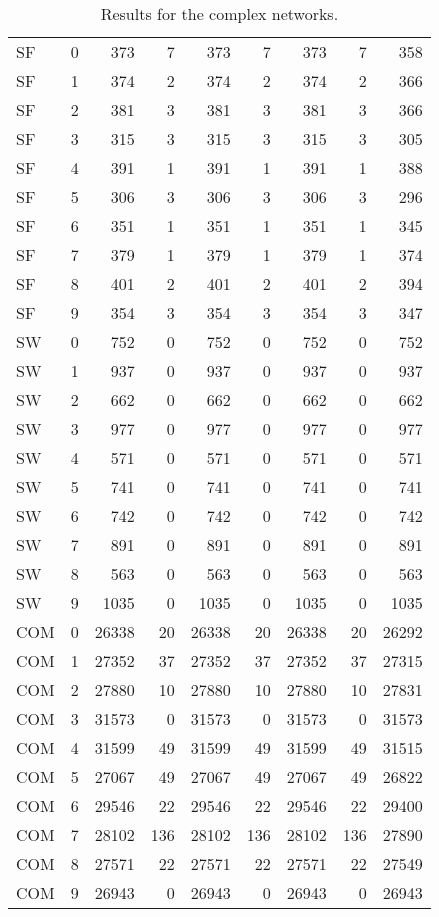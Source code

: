 \documentclass{scrartcl}
\theoremstyle{plain}
\begin{document}
\begin{table}[!ht]
\begin{tabular}{|lr|rr|rr|rr|r|}
\makeatletter{}SF & 0 & 373 & 7 & 373 & 7 & 373 & 7 & 358 \\ 
SF & 1 & 374 & 2 & 374 & 2 & 374 & 2 & 366 \\ 
SF & 2 & 381 & 3 & 381 & 3 & 381 & 3 & 366 \\ 
SF & 3 & 315 & 3 & 315 & 3 & 315 & 3 & 305 \\ 
SF & 4 & 391 & 1 & 391 & 1 & 391 & 1 & 388 \\ 
SF & 5 & 306 & 3 & 306 & 3 & 306 & 3 & 296 \\ 
SF & 6 & 351 & 1 & 351 & 1 & 351 & 1 & 345 \\ 
SF & 7 & 379 & 1 & 379 & 1 & 379 & 1 & 374 \\ 
SF & 8 & 401 & 2 & 401 & 2 & 401 & 2 & 394 \\ 
SF & 9 & 354 & 3 & 354 & 3 & 354 & 3 & 347 \\ 
SW & 0 & 752 & 0 & 752 & 0 & 752 & 0 & 752 \\ 
SW & 1 & 937 & 0 & 937 & 0 & 937 & 0 & 937 \\ 
SW & 2 & 662 & 0 & 662 & 0 & 662 & 0 & 662 \\ 
SW & 3 & 977 & 0 & 977 & 0 & 977 & 0 & 977 \\ 
SW & 4 & 571 & 0 & 571 & 0 & 571 & 0 & 571 \\ 
SW & 5 & 741 & 0 & 741 & 0 & 741 & 0 & 741 \\ 
SW & 6 & 742 & 0 & 742 & 0 & 742 & 0 & 742 \\ 
SW & 7 & 891 & 0 & 891 & 0 & 891 & 0 & 891 \\ 
SW & 8 & 563 & 0 & 563 & 0 & 563 & 0 & 563 \\ 
SW & 9 & 1035 & 0 & 1035 & 0 & 1035 & 0 & 1035 \\ 
COM & 0 & 26338 & 20 & 26338 & 20 & 26338 & 20 & 26292 \\ 
COM & 1 & 27352 & 37 & 27352 & 37 & 27352 & 37 & 27315 \\ 
COM & 2 & 27880 & 10 & 27880 & 10 & 27880 & 10 & 27831 \\ 
COM & 3 & 31573 & 0 & 31573 & 0 & 31573 & 0 & 31573 \\ 
COM & 4 & 31599 & 49 & 31599 & 49 & 31599 & 49 & 31515 \\ 
COM & 5 & 27067 & 49 & 27067 & 49 & 27067 & 49 & 26822 \\ 
COM & 6 & 29546 & 22 & 29546 & 22 & 29546 & 22 & 29400 \\ 
COM & 7 & 28102 & 136 & 28102 & 136 & 28102 & 136 & 27890 \\ 
COM & 8 & 27571 & 22 & 27571 & 22 & 27571 & 22 & 27549 \\ 
COM & 9 & 26943 & 0 & 26943 & 0 & 26943 & 0 & 26943 \\ 
 

\hline
\end{tabular}

	\caption{\label{tab:complex_sto}Results for the complex networks.}
\end{table}

 
\clearpage



\end{document}
